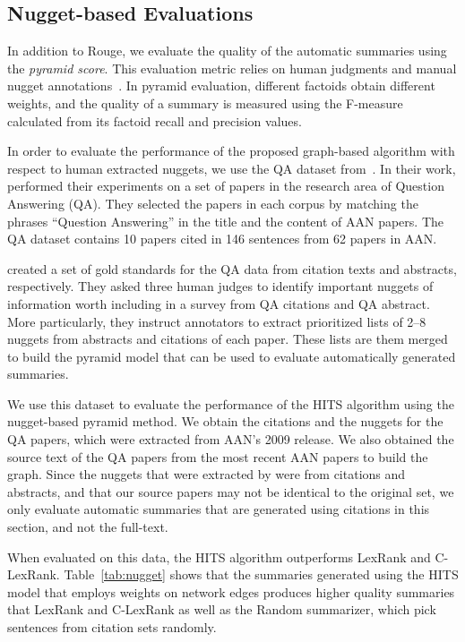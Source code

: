 
\subsection{Nugget-based Evaluations}
In addition to Rouge, we evaluate the quality of the automatic summaries using the \emph{pyramid score}. This evaluation metric relies on human judgments and manual nugget annotations~\cite{jimmy06,nenkova2004ecs,Wesley:2004,Vorhees:2003}. In pyramid evaluation, different factoids \cite{vahed&radev2011} obtain different weights, and the quality of a summary is measured using the F-measure calculated from its factoid recall and  precision values. 

In order to evaluate the performance of the proposed graph-based algorithm with respect to human extracted nuggets, we use the QA dataset from~\cite{mohammad-EtAl:2009:NAACLHLT09}. In their work,  performed their experiments on  a set of papers in the research area of Question Answering (QA).
They selected the papers in each corpus by matching the phrases ``Question Answering'' in the title and the content of AAN papers. The QA dataset contains 10 papers cited in 146 sentences from 62 papers in AAN.

 created a set of gold standards for the QA data from citation texts and abstracts, respectively.
They asked three human judges to identify important nuggets of information worth including in a survey from QA citations and QA abstract.
More particularly, they instruct annotators to extract prioritized lists of 2--8 nuggets from abstracts and citations of each paper. These lists are them merged to build the pyramid model that can be used to evaluate automatically generated summaries.

We use this dataset to evaluate the performance of the HITS algorithm using the nugget-based pyramid method. We obtain the citations and the nuggets for the QA papers, which were extracted from AAN's 2009 release. 
We also obtained the source text of the QA papers from the most recent AAN papers to build the graph. 
Since the nuggets that were extracted by  were from citations and abstracts, and that our source papers may not be identical to the original set, we only evaluate automatic summaries that are generated using citations in this section, and not the full-text.

When evaluated on this data, the HITS algorithm outperforms LexRank and C-LexRank. Table~\ref{tab:nugget} shows that the summaries generated using  the HITS model that employs weights on network edges produces higher quality summaries that LexRank and C-LexRank as well as the  Random summarizer, which pick sentences from citation sets randomly.

